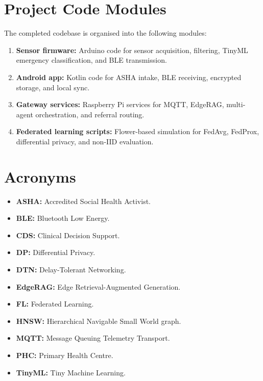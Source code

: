 \documentclass[12pt,a4paper,openany]{report}
\begin{document}
\section{Project Code Modules}
The completed codebase is organised into the following modules:
\begin{enumerate}
  \item \textbf{Sensor firmware:} Arduino code for sensor acquisition, filtering, TinyML emergency classification, and BLE transmission.
  \item \textbf{Android app:} Kotlin code for ASHA intake, BLE receiving, encrypted storage, and local sync.
  \item \textbf{Gateway services:} Raspberry Pi services for MQTT, EdgeRAG, multi-agent orchestration, and referral routing.
  \item \textbf{Federated learning scripts:} Flower-based simulation for FedAvg, FedProx, differential privacy, and non-IID evaluation.
\end{enumerate}

\section{Acronyms}
\begin{itemize}
  \item \textbf{ASHA:} Accredited Social Health Activist.
  \item \textbf{BLE:} Bluetooth Low Energy.
  \item \textbf{CDS:} Clinical Decision Support.
  \item \textbf{DP:} Differential Privacy.
  \item \textbf{DTN:} Delay-Tolerant Networking.
  \item \textbf{EdgeRAG:} Edge Retrieval-Augmented Generation.
  \item \textbf{FL:} Federated Learning.
  \item \textbf{HNSW:} Hierarchical Navigable Small World graph.
  \item \textbf{MQTT:} Message Queuing Telemetry Transport.
  \item \textbf{PHC:} Primary Health Centre.
  \item \textbf{TinyML:} Tiny Machine Learning.
\end{itemize}
\end{document}
